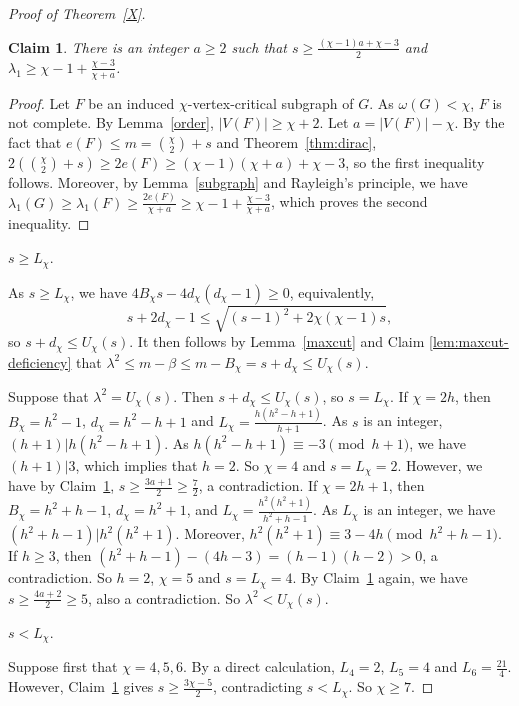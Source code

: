 \documentclass[10pt,a4paper]{amsart}
\newtheorem{claim}{Claim}[section]
\begin{document}
\begin{proof}[Proof of Theorem~\ref{X}]
\begin{claim}\label{lem:critical-estimates}
There is an integer $a\ge2$ such that $s\ge\frac{(\chi-1)a+\chi-3}{2}$ and $\lambda_1\ge \chi-1+\frac{\chi-3}{\chi+a}$.
\end{claim}

\begin{proof}
Let $F$ be an induced $\chi$-vertex-critical subgraph of $G$. As $\omega(G)<\chi$, $F$ is not complete. By Lemma~\ref{order}, $|V(F)|\ge \chi+2$. Let $a=|V(F)|-\chi$. By  the fact that $e(F)\le m=\binom \chi2+s$ and Theorem~\ref{thm:dirac}, $2(\binom \chi2+s)\ge 2e(F)\ge(\chi-1)(\chi+a)+\chi-3$, so the first inequality follows. 
Moreover, by Lemma~\ref{subgraph} and Rayleigh's principle, we have
$\lambda_1(G)\ge\lambda_1(F)\ge\frac{2e(F)}{\chi+a}\ge \chi-1+\frac{\chi-3}{\chi+a}$,
which proves the second inequality.
\end{proof}

 $s\ge L_\chi$.


As $s\ge L_\chi$, we have $4B_\chi s-4d_\chi(d_\chi-1)\ge 0$, equivalently, 
\[
s+2d_\chi-1\le\sqrt{(s-1)^2+2\chi(\chi-1)s},
\] 
so $s+d_\chi\le U_\chi(s)$. It then follows by Lemma~\ref{maxcut} and Claim \ref{lem:maxcut-deficiency} that 
$\lambda^2\le m-\beta\le m-B_\chi=s+d_\chi\le U_\chi(s)$.

Suppose that $\lambda^2 = U_\chi(s)$. 
Then $s+d_\chi\le U_\chi(s)$, so  $s=L_\chi$.
If $\chi=2h$, then $B_\chi=h^2-1$, $d_\chi=h^2-h+1$ and $L_\chi=\frac{h(h^2-h+1)}{h+1}$. As $s$ is an integer,  $(h+1)|h(h^2-h+1)$. As $h(h^2-h+1)\equiv -3\pmod {h+1}$, we have $(h+1)|3$, which implies that $h=2$. So $\chi=4$ and $s=L_\chi=2$. However, we have by Claim~\ref{lem:critical-estimates}, $s\ge \frac{3a+1}{2}\ge \frac{7}{2}$, a contradiction. 
If $\chi=2h+1$, then 
$B_\chi=h^2+h-1$, $d_\chi=h^2+1$, and $L_\chi=\frac{h^2(h^2+1)}{h^2+h-1}$.
As $L_\chi$ is an integer, we have $(h^2+h-1)|h^2(h^2+1)$. Moreover, 
$h^2(h^2+1)\equiv3-4h\pmod{h^2+h-1}$. If $h\ge 3$, then
$(h^2+h-1)-(4h-3)=(h-1)(h-2)>0$, a contradiction. So $h=2$, $\chi=5$ and $s=L_\chi=4$.
By Claim~\ref{lem:critical-estimates} again, we have $s\ge \frac{4a+2}{2}\ge 5$, also a contradiction. So $\lambda^2< U_\chi(s)$.


 $s< L_\chi$.



Suppose first that $\chi=4,5,6$. By a direct calculation, $L_4=2$, $L_5=4$ and $L_6=\frac{21}{4}$. However, Claim~\ref{lem:critical-estimates} gives $s\ge \frac{3\chi-5}{2}$, contradicting $s<L_\chi$. So $\chi\ge 7$.


\end{proof}
\end{document}
